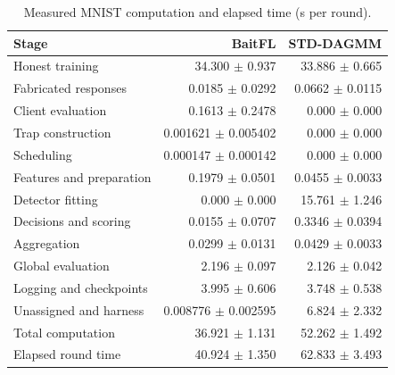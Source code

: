 \begin{table}[t]\centering\footnotesize\setlength{\tabcolsep}{8pt}
\caption{Measured MNIST computation and elapsed time (s per round).}\label{tab:std-segments-mnist}
\begin{tabular}{lrr}\toprule Stage & BaitFL & STD-DAGMM \\ \midrule
Honest training & 34.300 $\pm$ 0.937 & 33.886 $\pm$ 0.665 \\
Fabricated responses & 0.0185 $\pm$ 0.0292 & 0.0662 $\pm$ 0.0115 \\
Client evaluation & 0.1613 $\pm$ 0.2478 & 0.000 $\pm$ 0.000 \\
Trap construction & 0.001621 $\pm$ 0.005402 & 0.000 $\pm$ 0.000 \\
Scheduling & 0.000147 $\pm$ 0.000142 & 0.000 $\pm$ 0.000 \\
Features and preparation & 0.1979 $\pm$ 0.0501 & 0.0455 $\pm$ 0.0033 \\
Detector fitting & 0.000 $\pm$ 0.000 & 15.761 $\pm$ 1.246 \\
Decisions and scoring & 0.0155 $\pm$ 0.0707 & 0.3346 $\pm$ 0.0394 \\
Aggregation & 0.0299 $\pm$ 0.0131 & 0.0429 $\pm$ 0.0033 \\
Global evaluation & 2.196 $\pm$ 0.097 & 2.126 $\pm$ 0.042 \\
\midrule
Logging and checkpoints & 3.995 $\pm$ 0.606 & 3.748 $\pm$ 0.538 \\
Unassigned and harness & 0.008776 $\pm$ 0.002595 & 6.824 $\pm$ 2.332 \\
\midrule
Total computation & 36.921 $\pm$ 1.131 & 52.262 $\pm$ 1.492 \\
Elapsed round time & 40.924 $\pm$ 1.350 & 62.833 $\pm$ 3.493 \\
\bottomrule\end{tabular}\end{table}

